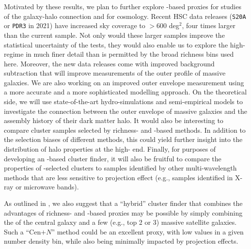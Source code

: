 \documentclass[fleqn,usenatbib,useAMS]{mnras}
\begin{document}
    Motivated by these results, we plan to further explore \mstar{}-based \mvir{} proxies for
    studies of the galaxy-halo connection and for cosmology.
    Recent HSC data releases (\texttt{S20A} or \texttt{PDR3} in 2021) have increased sky coverage to
    $> 600$ deg$^2$, four times larger than the current sample.
    Not only would these larger samples improve the statistical uncertainty of the \topn{} tests,
    they would also enable us to explore the high-\mvir{} regime in much finer detail than is
    permitted by the broad richness bins used here.
    Moreover, the new data releases come with improved background subtraction that will improve
    measurements of the outer profile of massive galaxies.
    We are also working on an improved outer envelope \mstar{} measurement using a more accurate
    \mlratio{} and a more sophisticated modelling approach.
    On the theoretical side, we will use state-of-the-art hydro-simulations and semi-empirical
    models to investigate the connection between the outer envelope of massive galaxies and the
    assembly history of their dark matter halo. 
    It would also be interesting to compare cluster samples selected by richness- and \mstar{}-based
    methods.
    In addition to the selection biases of different methods, this could yield further insight into
    the distribution of halo properties at the high-\mvir{} end. 
    Finally, for purposes of developing an \mstar{}-based cluster finder, it will also be fruitful
    to compare the properties of \mstar{}-selected clusters to samples identified by other
    multi-wavelength methods that are less sensitive to projection effect (e.g., samples identified
    in X-ray or microwave bands).

    As outlined in \citet{Bradshaw2020}, we also suggest that a ``hybrid'' cluster finder that
    combines the advantages of richness- and \mstar{}-based \mvir{} proxies may be possible by
    simply combining the \mstar{} of the central galaxy and a few (e.g., top 2 or 3) massive
    satellite galaxies.
    Such a ``Cen$+N$'' method could be an excellent \mvir{} proxy, with low \sigmvir{} values in a
    given number density bin, while also being minimally impacted by projection effects.
    
\end{document}
